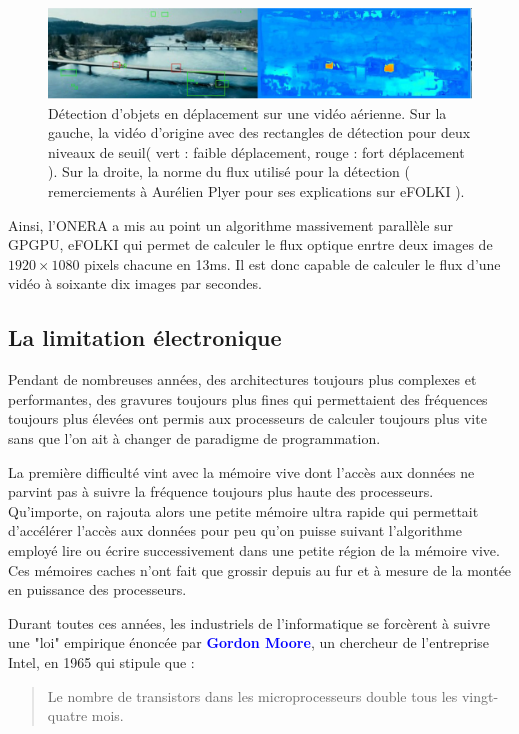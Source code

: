 \documentclass[fleqn,11pt]{article}
\begin{document}
\begin{figure}[h]
\includegraphics[width=\textwidth]{fluxvideo}
\caption{Détection d'objets en déplacement sur une vidéo aérienne. Sur la gauche, la vidéo d'origine avec des rectangles de détection pour deux niveaux de seuil( vert : faible déplacement, rouge : fort déplacement ). Sur la droite, la norme du flux utilisé pour la détection ( remerciements à Aurélien Plyer pour ses explications sur eFOLKI ).}
\end{figure}

Ainsi, l'ONERA a mis au point un algorithme massivement parallèle sur GPGPU, eFOLKI qui permet de calculer le flux optique enrtre deux images de $1920\times 1080$ pixels chacune en 13ms. Il est donc capable de calculer le flux d'une vidéo à soixante dix images par secondes.

\subsection{La limitation électronique}

Pendant de nombreuses années, des architectures toujours plus complexes et performantes, des gravures toujours plus fines qui permettaient des fréquences toujours plus élevées ont permis aux processeurs de calculer toujours plus vite sans que l'on ait à changer de paradigme de programmation.  

La première difficulté vint avec la mémoire vive dont l'accès aux données ne parvint pas à suivre la fréquence toujours plus haute des processeurs. Qu'importe, on rajouta alors une petite mémoire ultra rapide qui permettait d'accélérer l'accès aux données pour peu qu'on puisse suivant l'algorithme employé lire ou écrire successivement dans une petite région de la mémoire vive. Ces mémoires caches n'ont fait que grossir depuis au fur et à mesure de la montée en puissance des processeurs. 

Durant toutes ces années, les industriels de l'informatique se forcèrent à suivre une "loi" empirique énoncée par \textbf{\textcolor{blue}{Gordon Moore}}, un chercheur de l'entreprise Intel, en 1965 qui  stipule que :
\begin{quote}
Le nombre de transistors dans les microprocesseurs double tous les vingt-quatre mois.
\end{quote}
\end{document}
